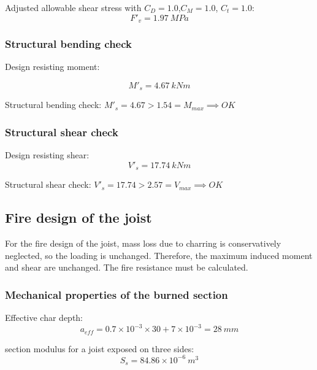 \documentclass[a4paper,11pt]{xc_memo}
\begin{document}
\noindent Adjusted allowable shear stress with $C_D= 1.0$,$C_M= 1.0$, $C_t= 1.0$:
\begin{equation}
  F'_v= 1.97\ MPa
\end{equation}

\subsubsection{Structural bending check}

\noindent Design resisting moment:

\begin{equation}
  M'_s= 4.67\ kN m
\end{equation}

\noindent Structural bending check: $M'_s = 4.67 > 1.54 = M_{max} \implies OK$

\subsubsection{Structural shear check}

\noindent Design resisting shear:
\begin{equation}
  V'_s= 17.74\ kN m
\end{equation}

\noindent Structural shear check: $V'_s = 17.74 > 2.57 = V_{max} \implies OK$

\subsection{Fire design of the joist}
For the fire design of the joist, mass loss due to charring is conservatively neglected, so the loading is unchanged. Therefore, the maximum induced moment and shear are unchanged. The fire resistance must be calculated.

\subsubsection{Mechanical properties of the burned section}

\noindent Effective char depth:
\begin{equation}
  a_{eff}= 0.7 \times 10^{-3} \times 30 + 7 \times 10^{-3}= 28\ mm
\end{equation}

\noindent section modulus for a joist exposed on three sides:
\begin{equation}
  S_s= 84.86 \times 10^{-6}\ m^3
\end{equation}
\end{document}
